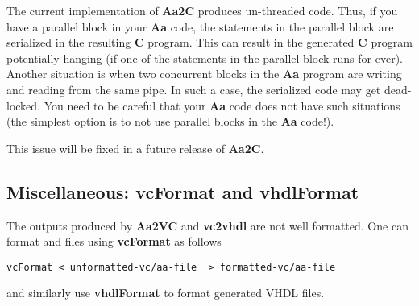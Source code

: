 The current implementation of {\bf Aa2C} produces un-threaded code.
Thus, if you have a parallel block in your {\bf Aa} code, the
statements in the parallel block are serialized in the resulting
{\bf C} program.  This can result in the generated {\bf C} program
potentially hanging (if one of the statements in the parallel
block runs for-ever).   Another situation is when two
concurrent blocks in the {\bf Aa} program are writing and reading
from the same pipe.  In such a case, the serialized code may
get dead-locked.  You need to be careful that your {\bf Aa} code
does not have such situations (the simplest option is
to not use parallel blocks in the {\bf Aa} code!).

This issue will be fixed in a future release of {\bf Aa2C}.

\subsection{Miscellaneous: {\bf vcFormat} and {\bf vhdlFormat}}

The outputs produced by {\bf Aa2VC} and {\bf vc2vhdl} are
not well formatted.  One can format \Aa and \vC files
using  {\bf vcFormat} as follows
\begin{verbatim}
vcFormat < unformatted-vc/aa-file  > formatted-vc/aa-file
\end{verbatim}
and similarly use {\bf vhdlFormat} to format generated
VHDL files.


